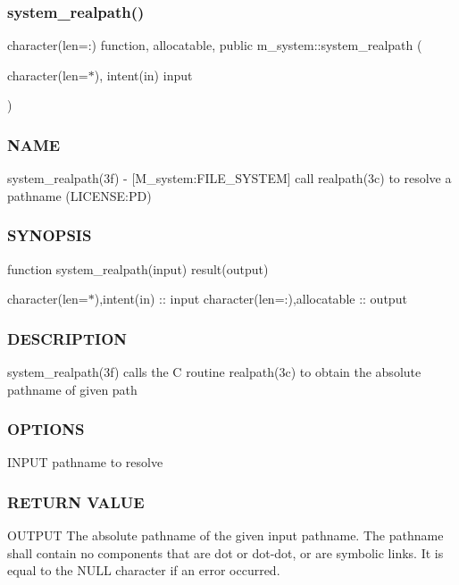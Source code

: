 \subsubsection{\texorpdfstring{system\+\_\+realpath()}{system\_realpath()}}
{\footnotesize\ttfamily character(len=\+:) function, allocatable, public m\+\_\+system\+::system\+\_\+realpath (\begin{DoxyParamCaption}\item[{character(len=$\ast$), intent(in)}]{input }\end{DoxyParamCaption})}



\subsubsection*{N\+A\+ME}

system\+\_\+realpath(3f) -\/ \mbox{[}M\+\_\+system\+:F\+I\+L\+E\+\_\+\+S\+Y\+S\+T\+EM\mbox{]} call realpath(3c) to resolve a pathname (L\+I\+C\+E\+N\+SE\+:PD) \subsubsection*{S\+Y\+N\+O\+P\+S\+IS}

function system\+\_\+realpath(input) result(output)

character(len=$\ast$),intent(in) \+:\+: input character(len=\+:),allocatable \+:\+: output \subsubsection*{D\+E\+S\+C\+R\+I\+P\+T\+I\+ON}

system\+\_\+realpath(3f) calls the C routine realpath(3c) to obtain the absolute pathname of given path \subsubsection*{O\+P\+T\+I\+O\+NS}

\begin{DoxyVerb}    INPUT     pathname to resolve
\end{DoxyVerb}


\subsubsection*{R\+E\+T\+U\+RN V\+A\+L\+UE}

O\+U\+T\+P\+UT The absolute pathname of the given input pathname. The pathname shall contain no components that are dot or dot-\/dot, or are symbolic links. It is equal to the N\+U\+LL character if an error occurred.

